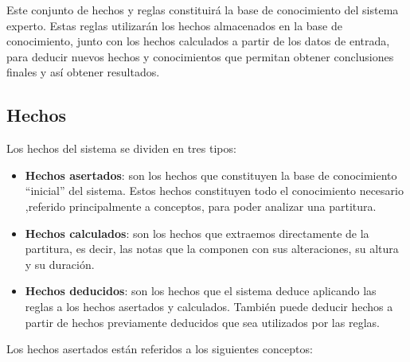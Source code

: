 Este conjunto de hechos y reglas constituirá la base de conocimiento del sistema experto. Estas reglas utilizarán los hechos almacenados en la base de conocimiento, junto con los hechos calculados a partir de los datos de entrada, para deducir nuevos hechos y conocimientos que permitan obtener conclusiones finales y así obtener resultados.

\subsection{Hechos}

Los hechos del sistema se dividen en tres tipos:

\begin{itemize}

	\item \textbf{Hechos asertados}: son los hechos que constituyen la base de conocimiento ``inicial'' del sistema. Estos hechos constituyen todo el conocimiento necesario ,referido principalmente a conceptos, para poder analizar una partitura. 

	\item \textbf{Hechos calculados}: son los hechos que extraemos directamente de la partitura, es decir, las notas que la componen con sus alteraciones, su altura y su duración.

	\item \textbf{Hechos deducidos}: son los hechos que el sistema deduce aplicando las reglas a los hechos asertados y calculados. También puede deducir hechos a partir de hechos previamente deducidos que sea utilizados por las reglas.

\end{itemize}

\bigskip

Los hechos asertados están referidos a los siguientes conceptos:

